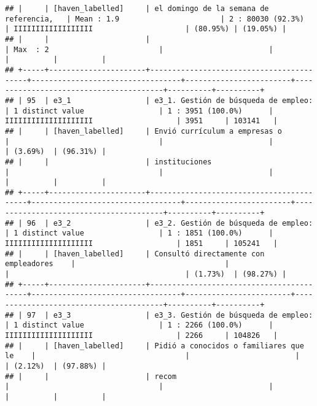\documentclass[]{article}
\begin{document}
\begin{verbatim}
## |     | [haven_labelled]     | el domingo de la semana de referencia,   | Mean : 1.9                       | 2 : 80030 (92.3%)      | IIIIIIIIIIIIIIIIII                     | (80.95%) | (19.05%) |
## |     |                      |                                          | Max  : 2                         |                        |                                        |          |          |
## +-----+----------------------+------------------------------------------+----------------------------------+------------------------+----------------------------------------+----------+----------+
## | 95  | e3_1                 | e3_1. Gestión de búsqueda de empleo:     | 1 distinct value                 | 1 : 3951 (100.0%)      | IIIIIIIIIIIIIIIIIIII                   | 3951     | 103141   |
## |     | [haven_labelled]     | Envió currículum a empresas o            |                                  |                        |                                        | (3.69%)  | (96.31%) |
## |     |                      | instituciones                            |                                  |                        |                                        |          |          |
## +-----+----------------------+------------------------------------------+----------------------------------+------------------------+----------------------------------------+----------+----------+
## | 96  | e3_2                 | e3_2. Gestión de búsqueda de empleo:     | 1 distinct value                 | 1 : 1851 (100.0%)      | IIIIIIIIIIIIIIIIIIII                   | 1851     | 105241   |
## |     | [haven_labelled]     | Consultó directamente con empleadores    |                                  |                        |                                        | (1.73%)  | (98.27%) |
## +-----+----------------------+------------------------------------------+----------------------------------+------------------------+----------------------------------------+----------+----------+
## | 97  | e3_3                 | e3_3. Gestión de búsqueda de empleo:     | 1 distinct value                 | 1 : 2266 (100.0%)      | IIIIIIIIIIIIIIIIIIII                   | 2266     | 104826   |
## |     | [haven_labelled]     | Pidió a conocidos o familiares que le    |                                  |                        |                                        | (2.12%)  | (97.88%) |
## |     |                      | recom                                    |                                  |                        |                                        |          |          |

\end{verbatim}
\end{document}
